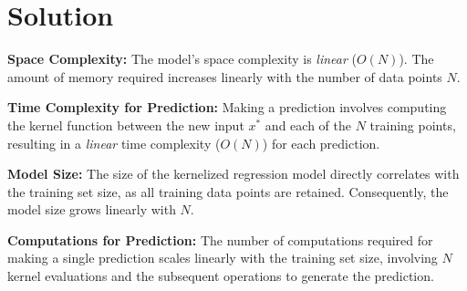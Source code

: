 \documentclass[submit]{harvardml}
\newenvironment{solution}
  {\color{blue}\section*{Solution}}
{}
\begin{document}
\begin{solution}
\textbf{Space Complexity:} The model's space complexity is \textit{linear} ($O(N)$). The amount of memory required increases linearly with the number of data points $N$.

\textbf{Time Complexity for Prediction:} Making a prediction involves computing the kernel function between the new input $x^*$ and each of the $N$ training points, resulting in a \textit{linear} time complexity ($O(N)$) for each prediction.

\textbf{Model Size:} The size of the kernelized regression model directly correlates with the training set size, as all training data points are retained. Consequently, the model size grows linearly with $N$.

\textbf{Computations for Prediction:} The number of computations required for making a single prediction scales linearly with the training set size, involving $N$ kernel evaluations and the subsequent operations to generate the prediction.


\end{solution}

\end{document}
